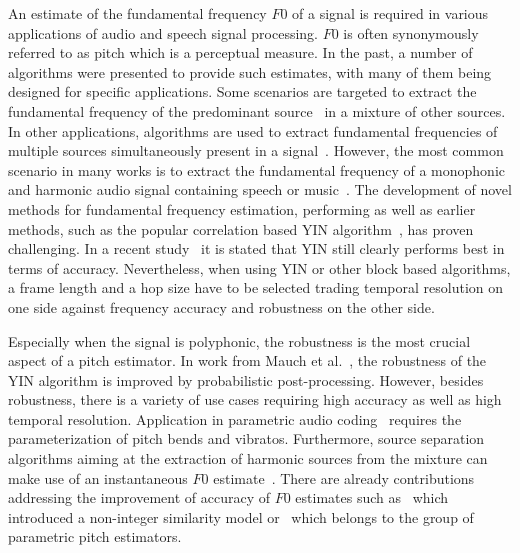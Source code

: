 An estimate of the fundamental frequency $F0$ of a signal is required in various applications of audio and speech signal processing. $F0$ is often synonymously referred to as pitch which is a perceptual measure. In the past, a number of algorithms were presented to provide such estimates, with many of them being designed for specific applications. Some scenarios are targeted to extract the fundamental frequency of the predominant source~\cite{salamon12} in a mixture of other sources. In other applications, algorithms are used to extract fundamental frequencies of multiple sources simultaneously present in a signal~\cite{klapuri2003multiple}. However, the most common scenario in many works is to extract the fundamental frequency of a monophonic and harmonic audio signal containing speech or music~\cite{talkin1995robust, boersma2002praat, de2002yin, resch, camacho2007swipe, tidhar2010high, christensen2007joint}.
%
The development of novel methods for fundamental frequency estimation, performing as well as earlier methods, such as the popular correlation based \textsc{YIN} algorithm~\cite{de2002yin}, has proven challenging. In a recent study~\cite{babacan2013comparative} it is stated that YIN still clearly performs best in terms of accuracy. Nevertheless, when using YIN or other block based algorithms, a frame length and a hop size have to be selected trading temporal resolution on one side against frequency accuracy and robustness on the other side.

Especially when the signal is polyphonic, the robustness is the most crucial aspect of a pitch estimator. In work from Mauch et al.~\cite{mauch2014pyin}, the robustness of the \textsc{YIN} algorithm is improved by probabilistic post-processing. However, besides robustness, there is a variety of use cases requiring high accuracy as well as high temporal resolution. Application in parametric audio coding~\cite{purnhagen2000hiln} requires the parameterization of pitch bends and vibratos. Furthermore, source separation algorithms aiming at the extraction of harmonic sources from the mixture can make use of an instantaneous $F0$ estimate~\cite{virtanen2008combining, stoterunison}. There are already contributions addressing the improvement of accuracy of $F0$ estimates such as~\cite{medan1991super} which introduced a non-integer similarity model or~\cite{christensen2007joint} which belongs to the group of parametric pitch estimators.


